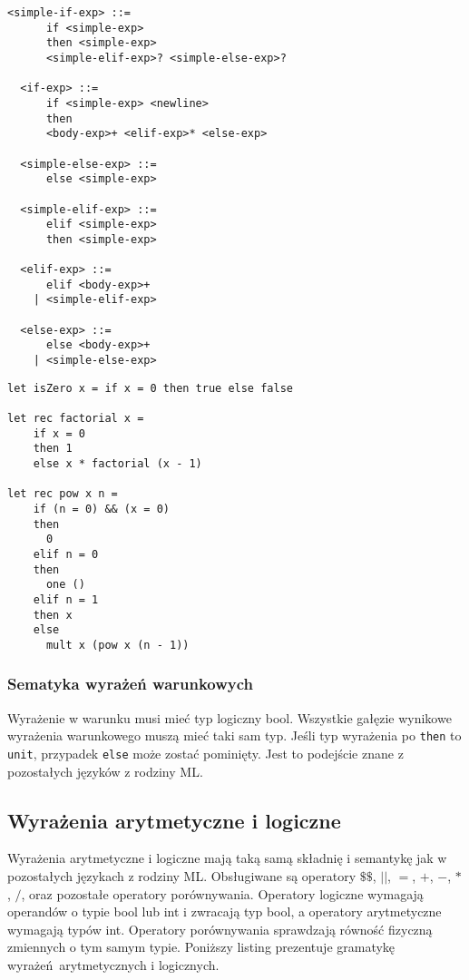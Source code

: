 \documentclass[declaration,shortabstract]{iithesis}
\begin{document}
\begin{lstlisting}[frame=single, caption=Wyrażenia warunkowe.]
  <simple-if-exp> ::= 
      if <simple-exp>  
      then <simple-exp> 
      <simple-elif-exp>? <simple-else-exp>?

  <if-exp> ::= 
      if <simple-exp> <newline>
      then 
      <body-exp>+ <elif-exp>* <else-exp>

  <simple-else-exp> ::=
      else <simple-exp> 

  <simple-elif-exp> ::=
      elif <simple-exp>
      then <simple-exp> 

  <elif-exp> ::=
      elif <body-exp>+ 
    | <simple-elif-exp> 

  <else-exp> ::=
      else <body-exp>+ 
    | <simple-else-exp> 
\end{lstlisting}

\begin{lstlisting}[frame=single, caption=Przykłady wyrażeń warunkowych.]
let isZero x = if x = 0 then true else false

let rec factorial x = 
    if x = 0 
    then 1 
    else x * factorial (x - 1)

let rec pow x n = 
    if (n = 0) && (x = 0)
    then 
      0 
    elif n = 0 
    then 
      one ()
    elif n = 1 
    then x
    else 
      mult x (pow x (n - 1))
\end{lstlisting}

\subsubsection{Sematyka wyrażeń warunkowych}
Wyrażenie w warunku musi mieć typ logiczny bool. Wszystkie gałęzie wynikowe
wyrażenia warunkowego muszą mieć taki sam typ. Jeśli typ wyrażenia po 
\texttt{then} 
to \texttt{unit}, przypadek \texttt{else} może zostać pominięty.
Jest to podejście znane z pozostałych języków z rodziny ML.

\subsection{Wyrażenia arytmetyczne i logiczne}
Wyrażenia arytmetyczne i logiczne mają taką samą składnię i semantykę
jak w pozostałych językach z rodziny ML. Obsługiwane są operatory $\$\$$, 
$||$, $=$, $+$, $-$, $*$, $/$, oraz pozostałe operatory porównywania. 
Operatory logiczne wymagają operandów o typie 
bool lub int i zwracają typ bool, a operatory arytmetyczne wymagają typów int. 
Operatory porównywania 
sprawdzają równość fizyczną zmiennych o tym samym typie.
Poniższy listing prezentuje gramatykę wyrażeń arytmetycznych i logicznych.
\end{document}
